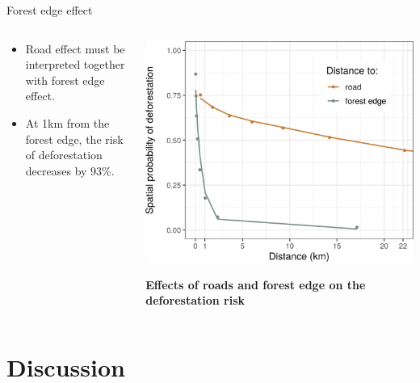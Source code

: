 \documentclass[10pt,table,dvipsnames,compress]{beamer}
\begin{document}
\begin{frame}[label={sec:org15252b5}]{Forest edge effect}
\begin{columns}
\begin{column}{0.5\columnwidth}
\begin{itemize}
\item Road effect must be interpreted together with forest edge effect.
\item At 1km from the forest edge, the risk of deforestation decreases by
93\%.
\end{itemize}
\end{column}

\begin{column}{0.5\columnwidth}
\includegraphics[width=\textwidth]{figs/article/proba-roads}

\textbf{Effects of roads and forest edge on the deforestation risk}
\end{column}
\end{columns}
\end{frame}

\section{Discussion}
\label{sec:org3132b2c}
\end{document}
